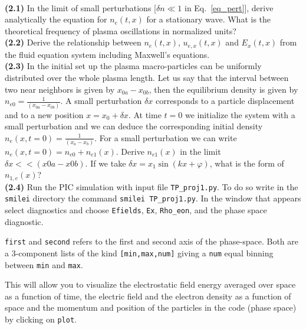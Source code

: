 \documentclass[11pt,a4paper]{article}
\begin{document}
\\
{\bf (2.1)} In the limit of small perturbations [$\delta n \ll 1$ in Eq.~\eqref{eq_pert}], derive analytically the equation for $n_e(t,x)$ for a stationary wave. What is the theoretical frequency of plasma oscillations in normalized units?\\
{\bf (2.2)} Derive the relationship between $n_e(t,x)$, $u_{e,x}(t,x)$ and $E_x(t,x)$ from the fluid equation system including Maxwell's equations.\\
{\bf (2.3)} In the initial set up the plasma macro-particles  can be uniformly distributed over the whole plasma length. Let us say that the interval between two near neighbors is given by  $x_{0a}-x_{0b}$, then   the equilibrium density is given by  $n_{e0} = \frac{1}{(x_{0a}-x_{0b})}$. A small perturbation $\delta x$  corresponds to a particle displacement and to a new position  $x = x_0 +  \delta x$. At time $t=0$ we initialize the system with a small perturbation and we can deduce the corresponding initial density  $n_e(x,t=0)= \frac{1}{(x_{a}-x_{b})}$. For a small perturbation we can write  $n_e(x,t=0)=n_{e0}+n_{e1}(x)$. Derive   $n_{e1}(x)$ in the limit  $\delta x << (x0a-x0b)$. If we take  $\delta x = x_1 \sin(kx +\varphi)$, what is the form of $n_{1,e}(x)$? \\
{\bf (2.4)} Run the PIC simulation with input file \texttt{TP\_proj1.py}. To do so write in the \texttt{smilei} directory the command 
\texttt{smilei TP\_proj1.py}. In the window that appears select diagnostics and choose \texttt{Efields}, \texttt{Ex}, \texttt{Rho\_eon}, and the phase space diagnostic. 



\texttt{first} and \texttt{second} refers to the first and second axis of the phase-space. Both are a 3-component lists of the kind \texttt{[min,max,num]} giving a \texttt
{num} equal binning between \texttt{min} and \texttt{max}.

This will allow you to visualize the electrostatic field energy averaged over space as a function of time,  the electric field and the electron density  as a function of space and the momentum and position of the particles in the code (phase space) by clicking on \texttt{plot}.
\end{document}

